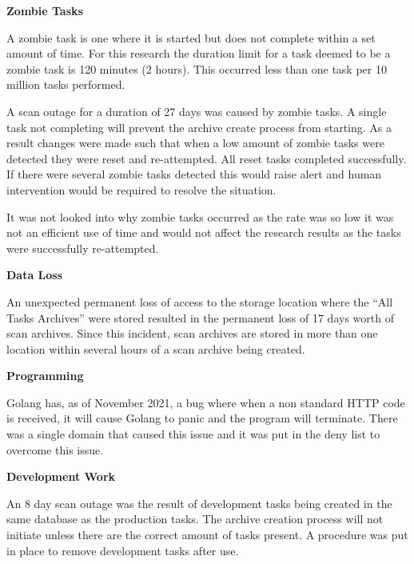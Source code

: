 \documentclass{mscreport}
\begin{document}
\textbf{Zombie Tasks}

\vspace{0.2cm} \noindent
A zombie task is one where it is started but does not complete within a set amount of time. For this research the duration limit for a task deemed to be a zombie task is 120 minutes (2 hours). This occurred less than one task per 10 million tasks performed.

\vspace{0.2cm} \noindent
A scan outage for a duration of 27 days was caused by zombie tasks. A single task not completing will prevent the archive create process from starting. As a result changes were made such that when a low amount of zombie tasks were detected they were reset and re-attempted. All reset tasks completed successfully. If there were several zombie tasks detected this would raise alert and human intervention would be required to resolve the situation.

\vspace{0.2cm} \noindent
It was not looked into why zombie tasks occurred as the rate was so low it was not an efficient use of time and would not affect the research results as the tasks were successfully re-attempted.

\vspace{0.6cm} \noindent
\textbf{Data Loss}

\vspace{0.2cm} \noindent
An unexpected permanent loss of access to the storage location where the ``All Tasks Archives'' were stored resulted in the permanent loss of 17 days worth of scan archives. Since this incident, scan archives are stored in more than one location within several hours of a scan archive being created.

\vspace{0.6cm} \noindent
\textbf{Programming}

\vspace{0.2cm} \noindent
Golang has, as of November 2021, a bug \cite{noauthor_undated-kp} where when a non standard HTTP code is received, it will cause Golang to panic and the program will terminate. There was a single domain that caused this issue and it was put in the deny list to overcome this issue.

\vspace{0.6cm} \noindent
\textbf{Development Work}

\vspace{0.2cm} \noindent
An 8 day scan outage was the result of development tasks being created in the same database as the production tasks. The archive creation process will not initiate unless there are the correct amount of tasks present. A procedure was put in place to remove development tasks after use.
\end{document}
